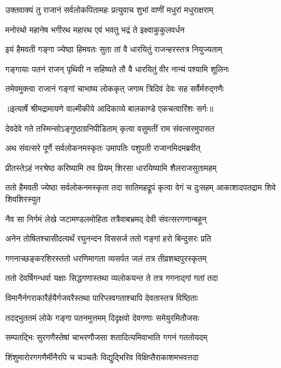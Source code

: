 \twolineshloka
{उक्तवाक्यं तु राजानं सर्वलोकपितामहः}
{प्रत्युवाच शुभां वाणीं मधुरां मधुराक्षराम्} %

\twolineshloka
{मनोरथो महानेष भगीरथ महारथ}
{एवं भवतु भद्रं ते इक्ष्वाकुकुलवर्धन} %

\twolineshloka
{इयं हैमवती गङ्गा ज्येष्ठा हिमवतः सुता}
{तां वै धारयितुं राजन्हरस्तत्र नियुज्यताम्} %

\twolineshloka
{गङ्गायाः पतनं राजन् पृथिवी न सहिष्यते}
{तौ वै धारयितुं वीर नान्यं पश्यामि शूलिनः} %

\twolineshloka
{तमेवमुक्त्वा राजानं गङ्गां चाभाष्य लोककृत्}
{जगाम त्रिदिवं देवः सह सर्वैर्मरुद्गणैः} %


{॥इत्यार्षे श्रीमद्रामायणे वाल्मीकीये आदिकाव्ये बालकाण्डे एकचत्वारिंशः सर्गः॥}


\twolineshloka
{देवदेवे गते तस्मिन्सोऽङ्गुष्ठाग्रनिपीडिताम्}
{कृत्वा वसुमतीं राम संवत्सरमुपासत} %

\twolineshloka
{अथ संवत्सरे पूर्णे सर्वलोकनमस्कृतः}
{उमापतिः पशुपती राजानमिदमब्रवीत्} %

\twolineshloka
{प्रीतस्तेऽहं नरश्रेष्ठ करिष्यामि तव प्रियम्}
{शिरसा धारयिष्यामि शैलराजसुतामहम्} %

\threelineshloka
{ततो हैमवती ज्येष्ठा सर्वलोकनमस्कृता}
{तदा सातिमहद्रूपं कृत्वा वेगं च दुःसहम्}
{आकाशादपतद्राम शिवे शिवशिरस्युत} %

\twolineshloka
{नैव सा निर्गमं लेखे जटामण्डलमोहिता}
{तत्रैवाबभ्रमद् देवी संवत्सरगणान्बहून्} %

\twolineshloka
{अनेन तोषितश्चासीदत्यर्थं रघुनन्दन}
{विससर्ज ततो गङ्गां हरो बिन्दुसरः प्रति} %

\twolineshloka
{गगनाच्छङ्करशिरस्ततो धरणिमागता}
{व्यसर्पत जलं तत्र तीव्रशब्दपुरस्कृतम्} %

\twolineshloka
{ततो देवर्षिगन्धर्वा यक्षाः सिद्धगणास्तथा}
{व्यलोकयन्त ते तत्र गगनाद्गां गतां तदा} %

\twolineshloka
{विमानैर्नगराकारैर्हयैर्गजवरैस्तथा}
{पारिप्लवगताश्चापि देवतास्तत्र विष्ठिताः} %

\twolineshloka
{तदद्भुततमं लोके गङ्गा पतनमुत्तमम्}
{दिदृक्षवो देवगणाः समेयुरमितौजसः} %

\twolineshloka
{सम्पतद्भिः सुरगणैस्तेषां चाभरणौजसा}
{शतादित्यमिवाभाति गगनं गततोयदम्} %

\twolineshloka
{शिंशुमारोरगगणैर्मीनैरपि च चञ्चलैः}
{विद्युद्भिरिव विक्षिप्तैराकाशमभवत्तदा} %

